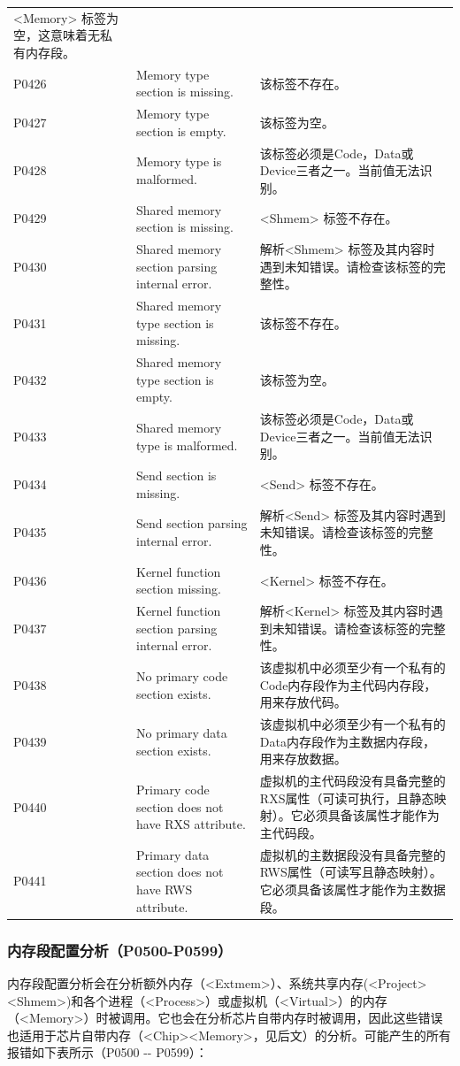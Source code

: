 \begin{xltabular}{\textwidth}{@{}>{\hsize\raggedright\arraybackslash}X>{\hsize\raggedright\arraybackslash}X>{\hsize\raggedright\arraybackslash}X@{}}
<Memory> 标签为空，这意味着无私有内存段。\tabularnewline
P0426 & Memory type section is missing. & 该标签不存在。\tabularnewline
P0427 & Memory type section is empty. & 该标签为空。\tabularnewline
P0428 & Memory type is malformed. & 该标签必须是Code，Data或Device三者之一。当前值无法识别。\tabularnewline
P0429 & Shared memory section is missing. &
<Shmem> 标签不存在。\tabularnewline
P0430 & Shared memory section parsing internal error. &
解析<Shmem> 标签及其内容时遇到未知错误。请检查该标签的完整性。\tabularnewline
P0431 & Shared memory type section is missing. & 该标签不存在。\tabularnewline
P0432 & Shared memory type section is empty. & 该标签为空。\tabularnewline
P0433 & Shared memory type is malformed. & 该标签必须是Code，Data或Device三者之一。当前值无法识别。\tabularnewline
P0434 & Send section is missing. &
<Send> 标签不存在。\tabularnewline
P0435 & Send section parsing internal error. &
解析<Send> 标签及其内容时遇到未知错误。请检查该标签的完整性。\tabularnewline
P0436 & Kernel function section missing. &
<Kernel> 标签不存在。\tabularnewline
P0437 & Kernel function section parsing internal error. &
解析<Kernel> 标签及其内容时遇到未知错误。请检查该标签的完整性。\tabularnewline
P0438 & No primary code section exists. &
该虚拟机中必须至少有一个私有的Code内存段作为主代码内存段，用来存放代码。\tabularnewline
P0439 & No primary data section exists. &
该虚拟机中必须至少有一个私有的Data内存段作为主数据内存段，用来存放数据。\tabularnewline
P0440 & Primary code section does not have RXS attribute. &
虚拟机的主代码段没有具备完整的RXS属性（可读可执行，且静态映射）。它必须具备该属性才能作为主代码段。\tabularnewline
P0441 & Primary data section does not have RWS attribute. &
虚拟机的主数据段没有具备完整的RWS属性（可读写且静态映射）。它必须具备该属性才能作为主数据段。\tabularnewline
\end{xltabular}

\newpage
{}
\subsubsection{内存段配置分析（P0500-P0599）}\label{subsubsec:5-6-2-6}

内存段配置分析会在分析额外内存（<Extmem>）、系统共享内存(<Project><Shmem>)和各个进程（<Process>）或虚拟机（<Virtual>）的内存（<Memory>）时被调用。它也会在分析芯片自带内存时被调用，因此这些错误也适用于芯片自带内存（<Chip><Memory>，见后文）的分析。可能产生的所有报错如下表所示（P0500
-\/- P0599）：

